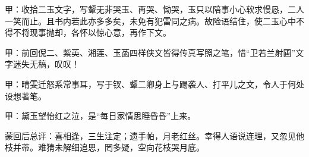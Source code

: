\begin{parag}
    \begin{note}甲：收拾二玉文字，写颦无非哭玉、再哭、恸哭，玉只以陪事小心软求慢恳，二人一笑而止。且书内若此亦多多矣，未免有犯雷同之病。故险语结住，使二玉心中不得不将现事抛却，各怀以惊心意，再作下文。\end{note}
\end{parag}


\begin{parag}
    \begin{note}甲：前回倪二、紫英、湘莲、玉菡四样侠文皆得传真写照之笔，惜“卫若兰射圃”文字迷失无稿，叹叹！\end{note}
\end{parag}


\begin{parag}
    \begin{note}甲：晴雯迁怒系常事耳，写于钗、颦二卿身上与踢袭人、打平儿之文，令人于何处设想著笔。\end{note}
\end{parag}


\begin{parag}
    \begin{note}甲：黛玉望怡红之泣，是“每日家情思睡昏昏”上来。\end{note}
\end{parag}


\begin{parag}
    \begin{note}蒙回后总评：喜相逢，三生注定；遗手帕，月老红丝。幸得人语说连理，又忽见他枝并蒂。难猜未解细追思，罔多疑，空向花枝哭月底。\end{note}
\end{parag}

